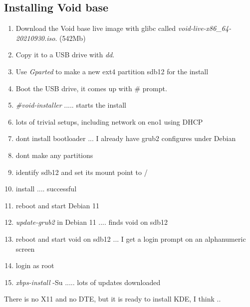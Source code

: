 \documentclass{article}  %
\begin{document}
\subsection{Installing Void base}
\begin{enumerate}
\item Download the Void base live image with glibc called {\em void-live-x86\_64-20210930.iso}. (542Mb)
\item  Copy it to a USB drive with {\em dd}.
\item Use {\em Gparted} to make a new ext4 partition sdb12 for the install 
\item Boot the USB drive, it comes up with \# prompt.
\item {\em \#void-installer} ..... starts the install
\item lots of trivial setups, including network on eno1 using DHCP
\item dont install bootloader ... I already have grub2 configures under Debian
\item dont make any partitions
\item identify sdb12 and set its mount point to /
\item install .... successful
\item reboot and start Debian 11
\item {\em update-grub2} in Debian 11  .... finds void on sdb12
\item reboot and start void on sdb12 ... I get a login prompt on an alphanumeric screen
\item login as root 
\item {\em xbps-install} -Su ..... lots of updates downloaded
\end{enumerate}
 There is no X11 and no DTE, but it is ready to install KDE, I think ..
\end{document}
